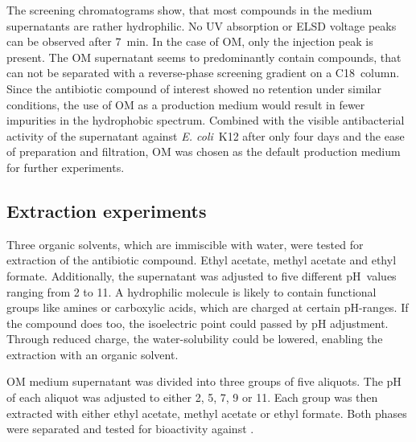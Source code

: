 	The screening chromatograms show, that most compounds in the medium supernatants are rather hydrophilic.
	No UV absorption or ELSD voltage peaks can be observed after \SI{7}{\minute}.
	In the case of OM, only the injection peak is present.
	The OM supernatant seems to predominantly contain compounds, that can not be separated with a reverse-phase screening gradient on a C18~column.
	Since the antibiotic compound of interest showed no retention under similar conditions, the use of OM as a production medium would result in fewer impurities in the hydrophobic spectrum.
	Combined with the visible antibacterial activity of the supernatant against \textit{E. coli}~K12 after only four days and the ease of preparation and filtration, OM was chosen as the default production medium for further experiments.
	
	\subsection{Extraction experiments}
	\label{sub:extraction_experiments}
	
	Three organic solvents, which are immiscible with water, were tested for extraction of the antibiotic compound.
	Ethyl acetate, methyl acetate and ethyl formate. Additionally, the supernatant was adjusted to five different pH~values ranging from 2 to 11.
	A hydrophilic molecule is likely to contain functional groups like amines or carboxylic acids, which are charged at certain pH-ranges.
	If the compound does too, the isoelectric point could passed by pH adjustment.
	Through reduced charge, the water-solubility could be lowered, enabling the extraction with an organic solvent.
	
	OM medium supernatant was divided into three groups of five aliquots.
	The pH of each aliquot was adjusted to either 2, 5, 7, 9 or 11.
	Each group was then extracted with either ethyl acetate, methyl acetate or ethyl formate.
	Both phases were separated and tested for bioactivity against \coli. 
	
